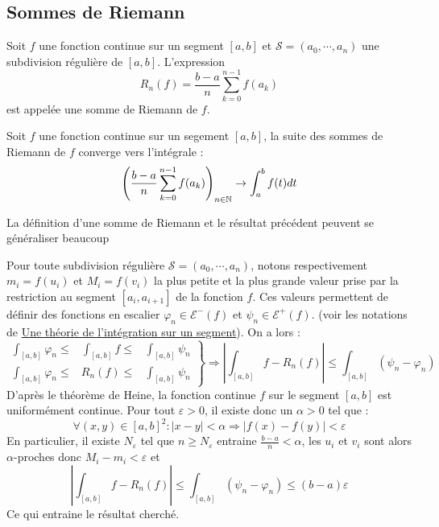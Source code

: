 \subsection{Sommes de Riemann} 
\begin{defi}
 Soit $f$ une fonction continue sur un segment $[a,b]$ et $\mathcal S=(a_0,\cdots,a_n)$ une subdivision régulière de $[a,b]$. L'expression
\begin{displaymath}
 R_n(f)= \frac{b-a}{n}\sum_{k=0}^{n-1}f(a_k)
\end{displaymath}
est appelée une somme de Riemann de $f$.
\end{defi}
\begin{prop}
 Soit $f$ une fonction continue sur un segement $[a,b]$, la suite des sommes de Riemann de $f$ converge vers l'intégrale :
\begin{displaymath}
 \left( \frac{b-a}{n}\sum_{k=0}^{n-1}f(a_k)\right)_{n\in \mathbb{N}} \rightarrow \int_a^b f(t)dt 
\end{displaymath}
\end{prop}
\begin{rem}
 La définition d'une somme de Riemann et le résultat précédent peuvent se généraliser beaucoup 
\end{rem}
\begin{demo}
 Pour toute subdivision régulière $\mathcal S=(a_0,\cdots,a_n)$, notons respectivement $m_i=f(u_i)$ et $M_i=f(v_i)$ la plus petite et la plus grande valeur prise par la restriction au segment $[a_i,a_{i+1}]$ de la fonction $f$. Ces valeurs permettent de définir des fonctions en escalier $\varphi_n\in \mathcal E^-(f)$ et $\psi_n\in \mathcal E^+(f)$. (voir les notations de \href{\baseurl C2189.pdf}{Une théorie de l'intégration sur un segment}). On a lors :
\begin{displaymath}
 \left.
\begin{aligned}
 \int_{[a,b]}\varphi_n \leq& \int_{[a,b]}f \leq& \int_{[a,b]}\psi_n \\
 \int_{[a,b]}\varphi_n \leq& R_n(f) \leq& \int_{[a,b]}\psi_n
\end{aligned}
 \right\rbrace 
\Rightarrow
\left\vert \int_{[a,b]}f - R_n(f)\right\vert \leq \int_{[a,b]}(\psi_n-\varphi_n)
\end{displaymath}
D'après le théorème de Heine, la fonction continue $f$ sur le segment $[a,b]$ est uniformément continue. Pour tout $\varepsilon >0$, il existe donc un $\alpha >0$ tel que :
\begin{displaymath}
 \forall(x,y)\in [a,b]^2 : |x-y|<\alpha \Rightarrow |f(x)-f(y)|<\varepsilon
\end{displaymath}
En particulier, il existe $N_\varepsilon$ tel que  $n\geq N_\varepsilon$ entraine $\frac{b-a}{n}<\alpha$, les $u_i$ et $v_i$ sont alors $\alpha$-proches donc $M_i-m_i<\varepsilon$ et 
\begin{displaymath}
 \left\vert \int_{[a,b]}f - R_n(f)\right\vert \leq \int_{[a,b]}(\psi_n-\varphi_n)\leq (b-a)\varepsilon
\end{displaymath}
Ce qui entraine le résultat cherché.
\end{demo}
